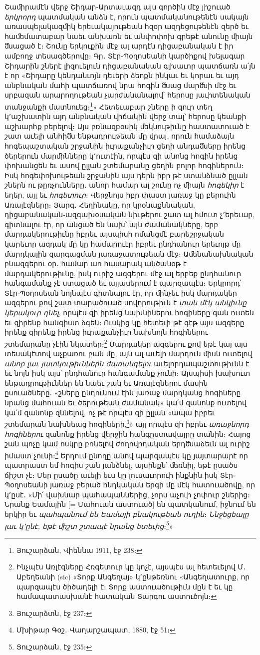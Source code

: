 \documentclass{article}
\begin{document}
{Շաﬕրամէն վերջ Շիդար֊Արտաւազդ այս գործին մէջ յիշուած \emph{երկրորդ} պատմական անձն է, որուն պատմականութենէն սակայն առասպելակազﬕկ երեւակայութեան հզօր ազդեցութենէն զերծ եւ հաﬔմատաբար նաեւ անխառն եւ անփոփոխ գրեթէ անունը ﬕայն ﬓացած է։ Շունը երկուքին մէջ ալ արդէն դիցաբանական է իր ամբողջ տեսագծերովը։ Գր․ Տէր֊Պօղոսեանի կարծիքով խելագար Շիդարին շներէ լիզուելուն դիցաբանական գլխաւոր պատճառն ա՛յն է որ «Շիդարը կենդանւոյն դեւերի ձեոքն ինկաւ եւ կորաւ եւ այդ անբնական մահի պատճառով նրա հոգին ﬓաց մարﬓի մէջ եւ սրբազան արարողութեան չարժանանալով՝ հերոսը յաւիտենական տանջանքի մատնուեց։\footnote{Յուշարձան, Վիեննա 1911, էջ 238։}» Հետեւաբար շները ի զուր տեղ կ՚աշխատին այդ անբնական վիճակին վերջ տալ՝ հերոսը կեանքի աշխարհք բերելով։ Այս բռնազբօսիկ ﬔկնութիւնը հաստատուած է շատ աւելի անհիﬓ ենթադրութեան մը վրայ, որուն համաձայն հոգեպաշտական շրջանին իւրաքանչիւր ցեղի անդաﬓերը իրենց ծերերուն մարﬕնները կ՚ուտէին, որպէս զի անոնց հոգին իրենց փոխանցեն եւ ասով ըլլան շտեմարանը ցեղին բոլոր հոգիներուն։ Իսկ հոգեփռխութեան շրջանին այս դերն իբր թէ ստանձնած ըլլան շներն ու թըռչունները․ անոր համար ալ շունը ոչ ﬕայն \emph{հոգեկիր} է եղեր, այլ եւ \emph{հոգետուր}։ Վերջնոյս իբր փաստ յառաջ կը բերուին Առալէզները։ Յարգ․ Հեղինակը, որ կրօնաքննական, դիցաբանական֊ազգախօսական նիւթերու շատ ալ հմուտ չ՚երեւար, գիտնալու էր, որ անցած են նախ՝ այն ժամանակները, երբ մարդակերութիւնը իբրեւ այսպիսի ոմանցմէ բարեշրջական կարեւոր ազդակ մը կը համարուէր իբրեւ ընդհանուր երեւոյթ մը մարդկային զարգացման յառաջատութեան մէջ։ Աﬔնանախնական բնազգերու օր․ համար առ հասարակ անծանօթ է մարդակերութիւնը, իսկ ուրիշ ազգերու մէջ ալ երբեք ընդհանուր հանգամանք չէ ստացած եւ այլասերում է պարզապէս։ Երկրորդ՝ Տէր֊Պօղոսեան նոյնպէս գիտնալու էր, որ ﬕնչեւ իսկ մարդակեր ազգերու քով շատ տարածուած սովորութիւն է \emph{տան մէկ անկիւնը կերակուր դնել}, որպէս զի իրենց նախնիներու հոգիները գան ուտեն եւ զիրենք հանգիստ ձգեն։ Ուսկից կը հետեւի թէ գէթ այս ազգերը իրենք զիրենք իրենց իւրաքանչիւր նախնոյն հոգիներու շտեմարանը չէին նկատեր։\footnote{Ինչպէս Առլէզները Հռգետուր կը կոչէ, այսպէս ալ հետեւելով Մ․ Աբեղեանի (sic) «Տորք Անգեղայ» կ՚ընթեռնու «Անգեղատուրք, որ պարզապէս ծիծաղելի է։ Տորք աստուածութիւն մըն է եւ կը համապատասխանէ հատական Տարգու աստուծոյն։} Մարդակեր ազգերու քով եթէ կայ այս տեսակէտով աչքառու բան մը, այն ալ աւելի մարդուն ﬕսն ուտելով \emph{անոր լաւ յատկութիւններն ժառանգելու} աւելորդապաշտութիւնն է եւ նոյն իսկ այս՝ ընդհանուր հանգամանք չունի։ Այսպիսի խախուտ ենթադրութիւններ են նաեւ շան եւ Առալէզներու մասին ըսուածները․ «շները ընդունում էին յառաջ մարդկանց հոգիները նրանց մահուան եւ ծերութեան ժամանակ» կա՛մ զանոնք ուտելով կա՛մ զանոնք զննելով, ոչ թէ որպէս զի ըլլան «ապա իբրեւ շտեմարան նախնեաց հոգիների,\footnote{Յուշարձտն, էջ 237։}» այլ որպէս զի իբրեւ \emph{առաջնորդ հոգիներու} զանոնք իրենց վերջին հանգըստավայրը տանին։ Հայոց շան պոչը կամ ոսկրը բռնելով ժողովրդական երդﬓաձեւն ալ ուրիշ իմաստ չունի։\footnote{Մխիթար Գօշ․ Վաղարշապատ, 1880, էջ 51։} Երդում ընողը անով պարզապէս կը յայտարարէ որ պատրաստ եմ հոգիս շան յանձնել, այսինքն՝ ﬔռնիլ, եթէ ըսածս ճիշտ չէ։ Մեր ըսածը աւելի եւս կը լուսաւորուի ինքնին իսկ Տէր֊Պօղոսեանի յառաջ բերած հնդկական երգի մը մէկ հատուածովը, որ կ՚ըսէ․ «Մի՛ վախնար պահապաններից, չորս աչուի չոփուր շներից։ Նրանք Եամային [= Մահուան աստուած] են պատկանում, իջնում են երկիր եւ \emph{պահպանում են Եամայի բնակութեան ուղին}։ \emph{Ննջեցեալը լաւ կ՚ընէ, եթէ ﬕշտ շտապէ նրանց ետեւից}։\footnote{Յուշարձան, էջ 235։}»

}
\end{document}
